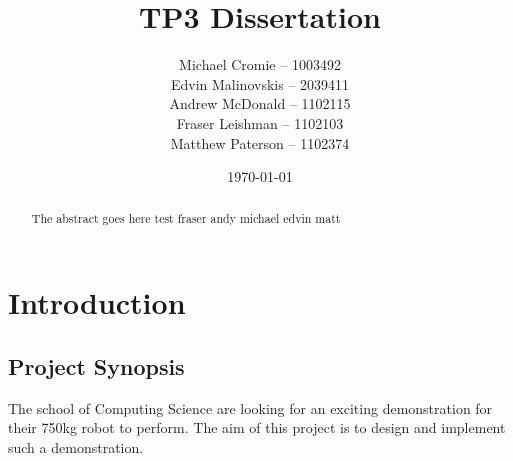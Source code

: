 \documentclass{l3proj}
\begin{document}








\title{TP3 Dissertation}
\author{Michael Cromie -- 1003492\\
        Edvin Malinovskis -- 2039411 \\
        Andrew McDonald -- 1102115  \\
        Fraser Leishman -- 1102103 \\
        Matthew Paterson -- 1102374 \\
        }
\date{\today}
\maketitle
\begin{abstract}
%
The abstract goes here test \cite{notes} \gls{fraser} \gls{andy} \gls{michael} \gls{edvin} \gls{matt}
%
\end{abstract}
\educationalconsent
\tableofcontents
\chapter{Introduction}
\label{intro}
\section{Project Synopsis}
The school of Computing Science are looking for an exciting demonstration for their 750kg robot to perform. The aim of this project is to design and implement such a demonstration.
\end{document}

